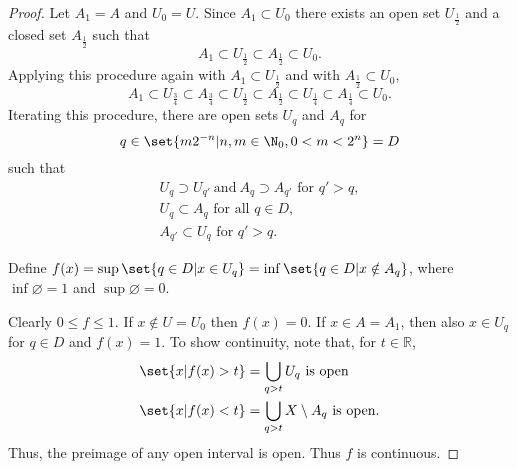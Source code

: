 \documentclass{article}
\renewcommand{\emptyset}{\varnothing}
\begin{document}
\begin{proof}
    Let $A_1 = A$ and $U_0 = U$. Since $A_1 \subset U_0$ there exists an open set $U_\frac{1}{2}$ and a closed set $A_\frac{1}{2}$ such that
    \begin{equation*}
        A_1 \subset U_\frac{1}{2} \subset A_\frac{1}{2} \subset U_0.
    \end{equation*}
    Applying this procedure again with $A_1 \subset U_\frac{1}{2}$ and with $A_\frac{1}{2} \subset U_0$,
    \begin{equation*}
        A_1 \subset U_\frac{3}{4} \subset A_\frac{3}{4} \subset U_\frac{1}{2} \subset A_\frac{1}{2} \subset U_\frac{1}{4} \subset A_\frac{1}{4} \subset U_0.
    \end{equation*}
    Iterating this procedure, there are open sets $U_q$ and $A_q$ for
    \begin{equation*}
        q \in \set{m 2^{-n} | n, m \in \N_0, 0 < m < 2^n} = D
    \end{equation*}
    such that
    \begin{gather*}
        U_q \supset U_{q'} \ \text{and} \ A_q \supset A_{q'} \text{ for } q' > q, \\
        U_q \subset A_q \text{ for all } q \in D, \\
        A_{q'} \subset U_q \text{ for } q' > q.
    \end{gather*}

    Define $f(x) = \sup\set{q \in D | x \in U_q} = \inf\set{q \in D | x \notin A_q}$, where $\inf \emptyset = 1$ and $\sup \emptyset = 0$.

    Clearly $0 \leq f \leq 1$. If $x \notin U = U_0$ then $f(x) = 0$. If $x \in A = A_1$, then also $x \in U_q$ for $q \in D$ and $f(x) = 1$.
    To show continuity, note that, for $t \in \mathbb{R}$,
    \begin{align*}
        \set{x | f(x) > t} &= \bigcup_{q > t} U_q \text{ is open} \\
        \set{x | f(x) < t} &= \bigcup_{q > t} X \setminus A_q \text{ is open}.
    \end{align*}
    Thus, the preimage of any open interval is open. Thus $f$ is continuous.
\end{proof}

\end{document}
